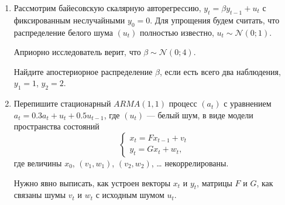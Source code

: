 \documentclass[12pt]{article}
\newcommand \cN{\mathcal{N}}
\begin{document}
\begin{enumerate}
\item Рассмотрим байесовскую скалярную авторегрессию, $y_t = \beta y_{t-1} + u_t$ с фиксированным неслучайными $y_0 = 0$.
Для упрощения будем считать, что распределение белого шума $(u_t)$ полностью известно, $u_t \sim \cN(0; 1)$.

Априорно исследователь верит, что $\beta \sim \cN(0; 4)$.

Найдите апостериорное распределение $\beta$, если есть всего два наблюдения, $y_1 = 1$, $y_2 = 2$.


\item Перепишите стационарный $ARMA(1, 1)$ процесс $(a_t)$ с уравнением $a_t =0.3a_t + u_t + 0.5 u_{t-1}$, 
где $(u_t)$ — белый шум, в виде модели пространства состояний
\[
    \begin{cases}
        x_t = F x_{t-1} + v_t \\
        y_t = G x_t + w_t,
    \end{cases}
\]
где величины $x_0$, $(v_1, w_1)$, $(v_2, w_2)$, \ldots{ } некоррелированы. 
    
Нужно явно выписать, как устроен векторы $x_t$ и $y_t$, матрицы $F$ и $G$, как связаны шумы $v_t$ и $w_t$ с исходным шумом $u_t$.
    
    

\end{enumerate}
\end{document}
